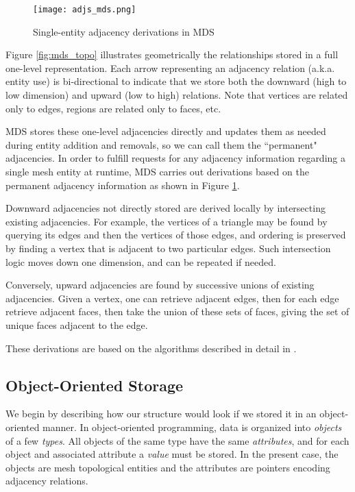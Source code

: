 \begin{figure}
\begin{center}
\texttt{[image: adjs\_mds.png]}
\caption{Single-entity adjacency derivations in MDS}
\label{fig:adjs_mds}
\end{center}
\end{figure}

Figure \ref{fig:mds_topo} illustrates geometrically the relationships
stored in a full one-level representation.
Each arrow representing an adjacency relation (a.k.a. entity use)
is bi-directional to indicate that we store both the
downward (high to low dimension) and upward (low to high) relations.
Note that vertices are related only to edges,
regions are related only to faces, etc.

MDS stores these one-level adjacencies directly
and updates them as needed during entity addition and removals,
so we can call them the ``permanent" adjacencies.
In order to fulfill requests for any adjacency information regarding a single
mesh entity at runtime,
MDS carries out derivations based on the permanent adjacency information
as shown in Figure \ref{fig:adjs_mds}.

Downward adjacencies not directly stored are derived
locally by intersecting existing adjacencies.
For example, the vertices of a triangle may be found
by querying its edges and then the vertices of those
edges, and ordering is preserved by finding a vertex
that is adjacent to two particular edges.
Such intersection logic moves down one dimension, and
can be repeated if needed.

Conversely, upward adjacencies are found by successive
unions of existing adjacencies.
Given a vertex, one can retrieve adjacent edges, then
for each edge retrieve adjacent faces, then take the
union of these sets of faces, giving the set of unique
faces adjacent to the edge.

These derivations are based on the algorithms described
in detail in \cite{seol2005fmdb}.

\subsection{Object-Oriented Storage}
\label{sec:sisc_oo}

We begin by describing how our structure would look
if we stored it in an object-oriented manner.
In object-oriented programming, data is organized
into {\it objects} of a few {\it types}.
All objects of the same type have the same {\it attributes},
and for each object and associated attribute a {\it value} must be stored.
In the present case, the objects are mesh topological entities
and the attributes are pointers encoding adjacency relations.

